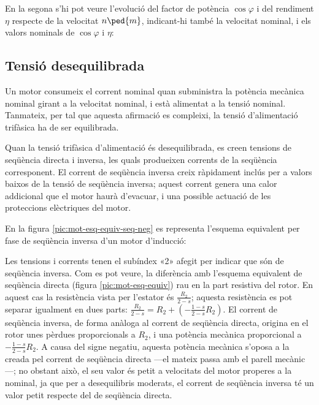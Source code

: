 \begin{exemple}
	En la segona s'hi pot veure l'evolució del factor de potència $\cos\varphi$ i del rendiment $\eta$ respecte de la velocitat $n\ped{m}$, indicant-hi també la  velocitat nominal, i els valors nominals de $\cos\varphi$ i $\eta$:
	\vspace{-3mm}
	\begin{center}
	\fontsize{10pt}{11pt}\selectfont
	
	\end{center}	

\end{exemple}

\subsection{Tensió desequilibrada}\label{sec:mot-tens-deseq}

Un motor consumeix el corrent nominal quan subministra la potència mecànica nominal girant a la velocitat nominal, i està alimentat a la tensió nominal. Tanmateix, per tal que aquesta afirmació es compleixi, la tensió d'alimentació trifàsica ha de ser equilibrada.

Quan la tensió trifàsica d'alimentació és desequilibrada, es creen tensions de seqüència directa i inversa, les quals  produeixen corrents de la seqüència corresponent. El corrent de seqüència inversa creix ràpidament inclús per a valors baixos de  la tensió de seqüència inversa; aquest corrent genera una calor addicional que el motor haurà d'evacuar, i una possible actuació de les proteccions elèctriques del motor.

En la figura \vref{pic:mot-esq-equiv-seq-neg} es representa l'esquema equivalent per fase de seqüència inversa d'un   motor d'inducció:
\vspace{-2mm}
\begin{center}
	
	\label{pic:mot-esq-equiv-seq-neg}
\end{center}

Les tensions i corrents tenen el subíndex «2» afegit per indicar que són de seqüència inversa. Com es pot veure, la diferència amb l'esquema equivalent de seqüència directa (figura \vref{pic:mot-esq-equiv}) rau en la part resistiva del rotor. En aquest cas la resistència vista per l'estator és $\frac{R_2}{2-s}$; aquesta resistència es pot separar igualment en dues parts: $\frac{R_2}{2-s} = R_2 + \left(-\frac{1-s}{2-s} R_2\right)$. El corrent de seqüència inversa, de forma anàloga al corrent de seqüència directa,  origina en el rotor unes pèrdues proporcionals a  $R_2$, i una potència mecànica proporcional a $- \frac{1-s}{2-s} R_2$. A causa del signe negatiu, aquesta potència mecànica  s'oposa a la  creada pel corrent de seqüència directa ---el mateix passa amb el parell mecànic---; no obstant això, el seu valor és petit a velocitats del motor properes a la nominal, ja que per a desequilibris moderats, el corrent de seqüència inversa té un valor petit respecte del de seqüència directa.

